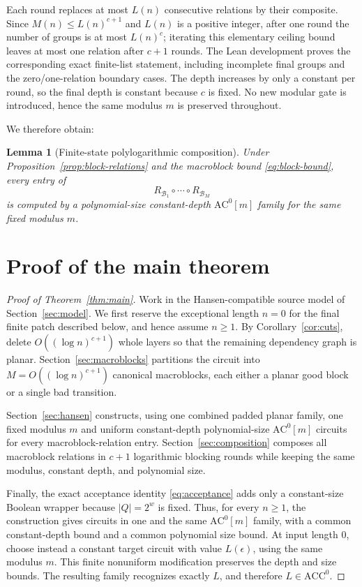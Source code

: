 \documentclass[11pt]{article}
\newtheorem{lemma}[theorem]{Lemma}
\theoremstyle{definition}
\newcommand{\ACC}{\mathrm{ACC}^{0}}
\newcommand{\ACm}[1]{\mathrm{AC}^{0}[#1]}
\newcommand{\cB}{\mathcal{B}}
\begin{document}
Each round replaces at most $L(n)$ consecutive relations by their composite.
Since $M(n)\le L(n)^{c+1}$ and $L(n)$ is a positive integer, after one round
the number of groups is at most $L(n)^c$; iterating this elementary ceiling
bound leaves at most one relation after $c+1$ rounds.  The Lean development
proves the corresponding exact finite-list statement, including incomplete
final groups and the zero/one-relation boundary cases.
The depth increases by only a constant per round, so the final depth is
constant because $c$ is fixed.  No new modular gate is introduced, hence the
same modulus $m$ is preserved throughout.

We therefore obtain:

\begin{lemma}[Finite-state polylogarithmic composition]\label{lem:composition}
Under Proposition~\ref{prop:block-relations} and the macroblock bound
\eqref{eq:block-bound}, every entry of
\[
  R_{\cB_1}\circ\cdots\circ R_{\cB_M}
\]
is computed by a polynomial-size constant-depth $\ACm{m}$ family for the same
fixed modulus $m$.
\end{lemma}

\section{Proof of the main theorem}\label{sec:mainproof}

\begin{proof}[Proof of Theorem~\ref{thm:main}]
Work in the Hansen-compatible source model of Section~\ref{sec:model}.  We first
reserve the exceptional length $n=0$ for the final finite patch described
below, and hence assume $n\ge1$.  By Corollary~\ref{cor:cuts}, delete
$O((\log n)^{c+1})$ whole layers so that the remaining dependency graph is
planar.  Section~\ref{sec:macroblocks} partitions the circuit into
$M=O((\log n)^{c+1})$ canonical macroblocks, each either a planar good block or
a single bad transition.

Section~\ref{sec:hansen} constructs, using one combined padded planar family,
one fixed modulus $m$ and uniform constant-depth polynomial-size $\ACm{m}$
circuits for every macroblock-relation entry.  Section~\ref{sec:composition}
composes all macroblock relations in $c+1$ logarithmic blocking rounds while
keeping the same modulus, constant depth, and polynomial size.

Finally, the exact acceptance identity \eqref{eq:acceptance} adds only a
constant-size Boolean wrapper because $|Q|=2^w$ is fixed.  Thus, for every
$n\ge1$, the construction gives circuits in one and the same $\ACm{m}$ family,
with a common constant-depth bound and a common polynomial size bound.  At
input length $0$, choose instead a constant target circuit with value
$L(\epsilon)$, using the same modulus $m$.  This finite nonuniform modification
preserves the depth and size bounds.  The resulting family recognizes exactly
$L$, and therefore $L\in\ACC$.
\end{proof}
\end{document}
